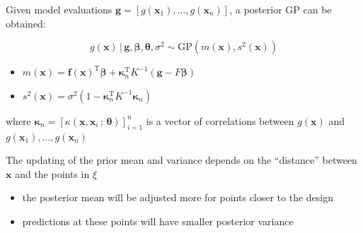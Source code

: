 \documentclass[
  ignorenonframetext,
]{beamer}
\providecommand{\tightlist}{%
  \setlength{\itemsep}{0pt}\setlength{\parskip}{0pt}}
\begin{document}
\begin{frame}{}
\protect\hypertarget{section-44}{}
Given model evaluations
\(\boldsymbol{g}= \left[g(\boldsymbol{x}_1), \ldots, g(\boldsymbol{x}_n)\right]\),
a posterior GP can be obtained:

\[
g(\boldsymbol{x})\,|\, \boldsymbol{g},\boldsymbol{\beta},\boldsymbol{\theta},\sigma^2 \sim \text{GP}\left(m(\boldsymbol{x}), s^2(\boldsymbol{x})\right) 
\]

\begin{itemize}
\tightlist
\item
  \(m(\boldsymbol{x}) = \boldsymbol{f}(\boldsymbol{x})^\mathrm{T}\boldsymbol{\beta}+ \boldsymbol{\kappa}_n^\mathrm{T}K^{-1}(\boldsymbol{g}- F\boldsymbol{\beta})\)
\item
  \(s^2(\boldsymbol{x}) = \sigma^2\left(1 - \boldsymbol{\kappa}_n^\mathrm{T}K^{-1}\boldsymbol{\kappa}_n\right)\)
\end{itemize}

where
\(\boldsymbol{\kappa}_n = [\kappa(\boldsymbol{x},\boldsymbol{x}_i\,;\,\boldsymbol{\theta})]_{i=1}^n\)
is a vector of correlations between \(g(\boldsymbol{x})\) and
\(g(\boldsymbol{x}_1),\ldots,g(\boldsymbol{x}_n)\)

The updating of the prior mean and variance depends on the ``distance''
between \(\boldsymbol{x}\) and the points in \(\xi\)

\begin{itemize}
\tightlist
\item
  the posterior mean will be adjusted more for points closer to the
  design
\item
  predictions at these points will have smaller posterior variance
\end{itemize}
\end{frame}
\end{document}
